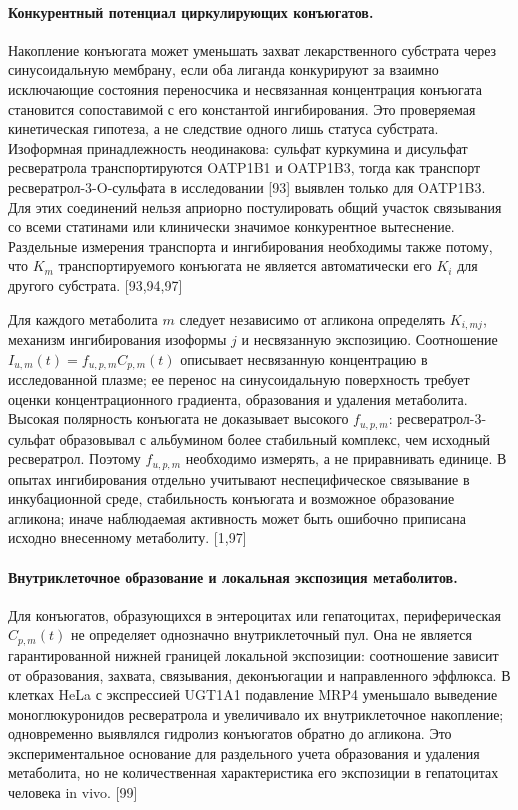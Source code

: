 \documentclass[11pt]{article}
\begin{document}
\paragraph{Конкурентный потенциал циркулирующих конъюгатов.}
Накопление конъюгата может уменьшать захват лекарственного субстрата через синусоидальную мембрану, если оба лиганда конкурируют за взаимно исключающие состояния переносчика и несвязанная концентрация конъюгата становится сопоставимой с его константой ингибирования. Это проверяемая кинетическая гипотеза, а не следствие одного лишь статуса субстрата. Изоформная принадлежность неодинакова: сульфат куркумина и дисульфат ресвератрола транспортируются OATP1B1 и OATP1B3, тогда как транспорт ресвератрол-3-O-сульфата в исследовании [93] выявлен только для OATP1B3. Для этих соединений нельзя априорно постулировать общий участок связывания со всеми статинами или клинически значимое конкурентное вытеснение. Раздельные измерения транспорта и ингибирования необходимы также потому, что \(K_m\) транспортируемого конъюгата не является автоматически его \(K_i\) для другого субстрата. [93,94,97]

Для каждого метаболита \(m\) следует независимо от агликона определять \(K_{i,mj}\), механизм ингибирования изоформы \(j\) и несвязанную экспозицию. Соотношение \(I_{u,m}(t)=f_{u,p,m}C_{p,m}(t)\) описывает несвязанную концентрацию в исследованной плазме; ее перенос на синусоидальную поверхность требует оценки концентрационного градиента, образования и удаления метаболита. Высокая полярность конъюгата не доказывает высокого \(f_{u,p,m}\): ресвератрол-3-сульфат образовывал с альбумином более стабильный комплекс, чем исходный ресвератрол. Поэтому \(f_{u,p,m}\) необходимо измерять, а не приравнивать единице. В опытах ингибирования отдельно учитывают неспецифическое связывание в инкубационной среде, стабильность конъюгата и возможное образование агликона; иначе наблюдаемая активность может быть ошибочно приписана исходно внесенному метаболиту. [1,97]

\paragraph{Внутриклеточное образование и локальная экспозиция метаболитов.}
Для конъюгатов, образующихся в энтероцитах или гепатоцитах, периферическая \(C_{p,m}(t)\) не определяет однозначно внутриклеточный пул. Она не является гарантированной нижней границей локальной экспозиции: соотношение зависит от образования, захвата, связывания, деконъюгации и направленного эффлюкса. В клетках HeLa с экспрессией UGT1A1 подавление MRP4 уменьшало выведение моноглюкуронидов ресвератрола и увеличивало их внутриклеточное накопление; одновременно выявлялся гидролиз конъюгатов обратно до агликона. Это экспериментальное основание для раздельного учета образования и удаления метаболита, но не количественная характеристика его экспозиции в гепатоцитах человека in vivo. [99]
\end{document}

